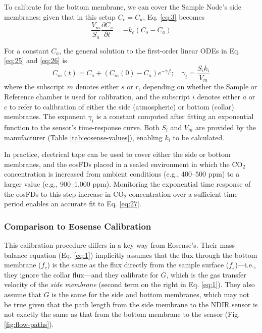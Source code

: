 \documentclass[11pt]{article}
\begin{document}
To calibrate for the bottom membrane, we can cover the Sample Node's side membranes; given that in this setup $C_c = C_a$, Eq. \ref{eq:3} becomes
\begin{equation}\label{eq:26}
	\frac{V_m}{S_a} \frac{\partial C_s}{\partial t} = -k_c(C_s - C_a)
\end{equation}

For a constant $C_a$, the general solution to the first-order linear ODEs in Eq. \ref{eq:25} and \ref{eq:26} is
\begin{equation}\label{eq:27}
	C_m(t) = C_a + (C_m(0) - C_a)e^{-\gamma_i t}; \quad \gamma_i = \frac{S_i k_i}{V_m}
\end{equation}
where the subscript $m$ denotes either $s$ or $r$, depending on whether the Sample or Reference chamber is used for calibration, and the subscript $i$ denotes either $a$ or $c$ to refer to calibration of either the side (atmospheric) or bottom (collar) membranes. The exponent  $\gamma_i$ is a constant computed after fitting an exponential function to the sensor's time-response curve. Both $S_i$ and $V_m$ are provided by the manufacturer (Table \ref{tab:eosense-values}), enabling $k_i$ to be calculated.

In practice, electrical tape can be used to cover either the side or bottom membranes, and the eosFDs placed in a sealed environment in which the CO$_2$ concentration is increased from ambient conditions (e.g., 400--500 ppm) to a larger value (e.g., 900--1,000 ppm). Monitoring the exponential time response of the eosFDs to this step increase in CO$_2$ concentration over a sufficient time period enables an accurate fit to Eq. \ref{eq:27}. 

\subsubsection{Comparison to Eosense Calibration}
This calibration procedure differs in a key way from Eosense's. Their mass balance equation (Eq. \ref{eq:1}) implicitly assumes that the flux through the bottom membrane ($f_c$) is the same as the flux directly from the sample surface ($f_s$)---i.e., they ignore the collar flux---and they calibrate for $G$, which is the gas transfer velocity of the \textit{side membrane} (second term on the right in Eq. \ref{eq:1}). They also assume that $G$ is the same for the side and bottom membranes, which may not be true given that the path length from the side membrane to the NDIR sensor is not exactly the same as that from the bottom membrane to the sensor (Fig. \ref{fig:flow-paths}).
\end{document}
